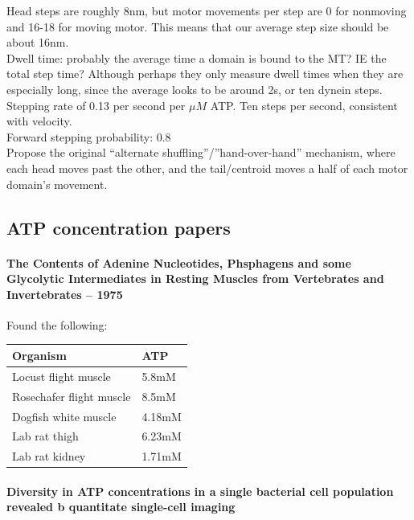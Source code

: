 \documentclass[10pt]{article} %
\begin{document}
Head steps are roughly 8nm, but motor movements per step are 0 for nonmoving and 16-18 for moving motor. This means that our average step size should be about 16nm.\\

Dwell time: probably the average time a domain is bound to the MT? IE the total step time? Although perhaps they only measure dwell times when they are especially long, since the average looks to be around 2s, or ten dynein steps.\\

Stepping rate of 0.13 per second per $\mu M$ ATP. Ten steps per second, consistent with velocity.\\

Forward stepping probability: 0.8\\

Propose the original ``alternate shuffling''/''hand-over-hand'' mechanism, where each head moves past the other, and the tail/centroid moves a half of each motor domain's movement.\\

\subsection{ATP concentration papers}
\paragraph{The Contents of Adenine Nucleotides, Phsphagens and some Glycolytic Intermediates in Resting Muscles from Vertebrates and Invertebrates -- 1975}

Found the following:

\begin{center}
  \begin{tabular}{| l | l |}
    \hline
    Organism & ATP\\ \hline
    Locust flight muscle & 5.8mM\\ \hline
    Rosechafer flight muscle & 8.5mM\\ \hline
    Dogfish white muscle & 4.18mM\\ \hline
    Lab rat thigh & 6.23mM\\ \hline
    Lab rat kidney & 1.71mM\\ \hline
  \end{tabular}
\end{center}

\paragraph{Diversity in ATP concentrations in a single bacterial cell population revealed b quantitate single-cell imaging}
\end{document}
